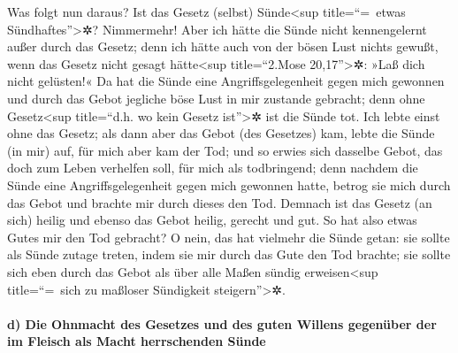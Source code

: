  Was folgt nun daraus? Ist das Gesetz (selbst)
Sünde\textless sup title=``=~etwas Sündhaftes''\textgreater✲?
Nimmermehr! Aber ich hätte die Sünde nicht kennengelernt außer durch das
Gesetz; denn ich hätte auch von der bösen Lust nichts gewußt, wenn das
Gesetz nicht gesagt hätte\textless sup title=``2.Mose
20,17''\textgreater✲: »Laß dich nicht gelüsten!«  Da hat
die Sünde eine Angriffsgelegenheit gegen mich gewonnen und durch das
Gebot jegliche böse Lust in mir zustande gebracht; denn ohne
Gesetz\textless sup title=``d.h. wo kein Gesetz ist''\textgreater✲ ist
die Sünde tot.  Ich lebte einst ohne das Gesetz; als dann
aber das Gebot (des Gesetzes) kam, lebte die Sünde (in mir) auf,
 für mich aber kam der Tod; und so erwies sich dasselbe
Gebot, das doch zum Leben verhelfen soll, für mich als todbringend;
 denn nachdem die Sünde eine Angriffsgelegenheit gegen
mich gewonnen hatte, betrog sie mich durch das Gebot und brachte mir
durch dieses den Tod.  Demnach ist das Gesetz (an sich)
heilig und ebenso das Gebot heilig, gerecht und gut.  So
hat also etwas Gutes mir den Tod gebracht? O nein, das hat vielmehr die
Sünde getan: sie sollte als Sünde zutage treten, indem sie mir durch das
Gute den Tod brachte; sie sollte sich eben durch das Gebot als über alle
Maßen sündig erweisen\textless sup title=``=~sich zu maßloser Sündigkeit
steigern''\textgreater✲.

\hypertarget{d-die-ohnmacht-des-gesetzes-und-des-guten-willens-gegenuxfcber-der-im-fleisch-als-macht-herrschenden-suxfcnde}{%
\paragraph{d) Die Ohnmacht des Gesetzes und des guten Willens gegenüber
der im Fleisch als Macht herrschenden
Sünde}\label{d-die-ohnmacht-des-gesetzes-und-des-guten-willens-gegenuxfcber-der-im-fleisch-als-macht-herrschenden-suxfcnde}}

